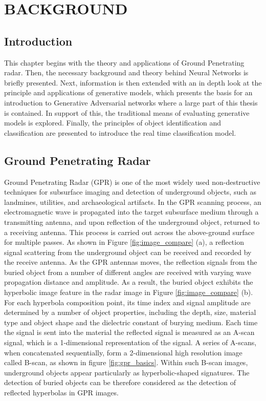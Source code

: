 \doublespacing
\chapter{BACKGROUND}


\section{Introduction}
\hspace{0.5in}This chapter begins with the theory and applications of Ground Penetrating radar. Then, the necessary background and theory behind Neural Networks is briefly presented. Next, information is then extended with an in depth look at the principle and applications of generative models, which presents the basis for an introduction to Generative Adversarial networks where a large part of this thesis is contained. In support of this, the traditional means of evaluating generative models is explored. Finally, the principles of object identification and classification are presented to introduce the real time classification model. 

\section{Ground Penetrating Radar}\label{GPR Backround}
\hspace{0.5in}Ground Penetrating Radar (GPR) is one of the most widely used non-destructive techniques for subsurface imaging and detection of underground objects, such as landmines, utilities, and archaeological artifacts. In the GPR scanning process, an electromagnetic wave is propagated into the target subsurface medium through a transmitting antenna, and upon reflection of the underground object, returned to a receiving antenna. This process is carried out across the above-ground surface for multiple passes. As shown in Figure \ref{fig:image_compare} (a), a reflection signal scattering from the underground object can be received and recorded by the receive antenna. As the GPR antennas moves, the reflection signals from the buried object from a number of different angles are received with varying wave propagation distance and amplitude. As a result, the buried object exhibits the hyperbolic image feature in the radar image in Figure \ref{fig:image_compare} (b). For each hyperbola composition point, its time index and signal amplitude are determined by a number of object properties, including the depth, size, material type and object shape and the dielectric constant of burying medium. Each time the signal is sent into the material the reflected signal is measured as an A-scan signal, which is a 1-dimensional representation of the signal. A series of A-scans, when concatenated sequentially, form a 2-dimensional high resolution image called B-scan, as shown in figure \ref{fig:gpr_basics}. Within such B-scan images, underground objects appear particularly as hyperbolic-shaped signatures. The detection of buried objects can be therefore considered as the detection of reflected hyperbolas in GPR images.
\vspace{0.5\baselineskip}

